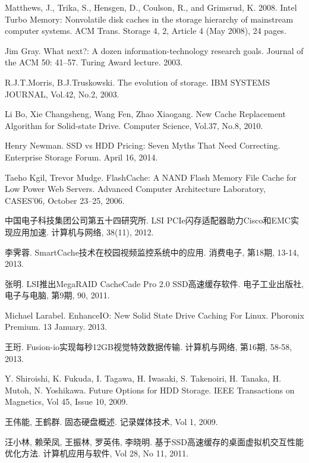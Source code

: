 ﻿\begin{thebibliography}

Matthews, J., Trika, S., Hensgen, D., Coulson, R., and Grimsrud, K. 2008. Intel Turbo Memory: Nonvolatile disk caches in the storage hierarchy of mainstream computer systems. ACM Trans. Storage 4, 2, Article 4 (May 2008), 24 pages.

Jim Gray. What next?: A dozen information-technology research goals. Journal of the ACM 50: 41–57. Turing Award lecture. 2003.

R.J.T.Morris, B.J.Truskowski. The evolution of storage. IBM SYSTEMS JOURNAL, Vol.42, No.2, 2003.

Li Bo, Xie Changsheng, Wang Fen, Zhao Xiaogang. New Cache Replacement Algorithm for Solid-state Drive. Computer Science, Vol.37, No.8, 2010.

Henry Newman. SSD vs HDD Pricing: Seven Myths That Need Correcting. Enterprise Storage Forum. April 16, 2014.

Taeho Kgil, Trevor Mudge. FlashCache: A NAND Flash Memory File Cache for Low Power Web Servers. Advanced Computer Architecture Laboratory, CASES’06, October 23–25, 2006.

中国电子科技集团公司第五十四研究所. LSI PCIe闪存适配器助力Cisco和EMC实现应用加速. 计算机与网络, 38(11), 2012.

李霁蓉. SmartCache技术在校园视频监控系统中的应用. 消费电子, 第18期, 13-14, 2013.

张明. LSI推出MegaRAID CacheCade Pro 2.0 SSD高速缓存软件. 电子工业出版社, 电子与电脑, 第9期, 90, 2011.

Michael Larabel. EnhanceIO: New Solid State Drive Caching For Linux. Phoronix Premium. 13 January. 2013.

王珩. Fusion-io实现每秒12GB视觉特效数据传输. 计算机与网络, 第16期, 58-58, 2013.

Y. Shiroishi, K. Fukuda, I. Tagawa, H. Iwasaki,  S. Takenoiri, H. Tanaka, H. Mutoh, N. Yoshikawa. Future Options for HDD Storage. IEEE Transactions on Magnetics, Vol 45, Issue 10, 2009.

王伟能, 王鹤群. 固态硬盘概述. 记录媒体技术, Vol 1, 2009.

汪小林, 赖荣凤, 王振林, 罗英伟, 李晓明. 基于SSD高速缓存的桌面虚拟机交互性能优化方法. 计算机应用与软件, Vol 28, No 11, 2011.


\end{thebibliography}
